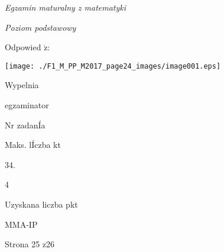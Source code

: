 \documentclass[a4paper,12pt]{article}
\begin{document}
{\it Egzamin maturalny z matematyki}

{\it Poziom podstawowy}

Odpowied $\acute{\mathrm{z}}$:
\begin{center}
\texttt{[image: ./F1\_M\_PP\_M2017\_page24\_images/image001.eps]}
\end{center}
Wypelnia

egzaminator

Nr zadanÍa

Maks. lÍczba kt

34.

4

Uzyskana liczba pkt

MMA-IP

Strona 25 z26
\end{document}
